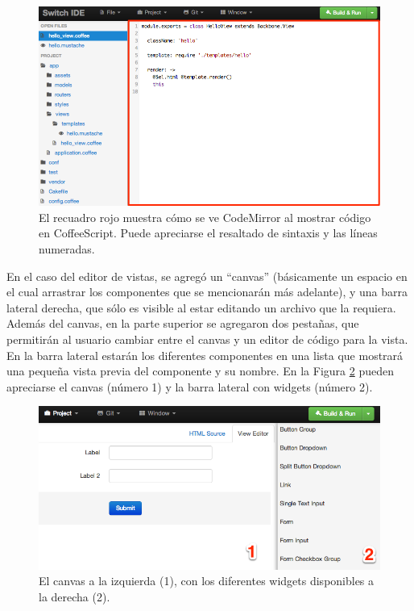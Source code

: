 \documentclass[12pt,spanish,letter]{report}
\makeatletter
\def\maxwidth{\ifdim\Gin@nat@width>\linewidth\linewidth
\else\Gin@nat@width\fi}
\let\Oldincludegraphics\includegraphics
\renewcommand{\includegraphics}[1]{\Oldincludegraphics[width=\maxwidth]{#1}}
\makeatother
\begin{document}
\begin{figure}[htbp]
\centering
\includegraphics{figures/codemirror.png}
\caption{El recuadro rojo muestra cómo se ve CodeMirror al mostrar
código en CoffeeScript. Puede apreciarse el resaltado de sintaxis y las
líneas numeradas. \label{figures:codemirror}}
\end{figure}

En el caso del editor de vistas, se agregó un ``canvas'' (básicamente un
espacio en el cual arrastrar los componentes que se mencionarán más
adelante), y una barra lateral derecha, que sólo es visible al estar
editando un archivo que la requiera. Además del canvas, en la parte
superior se agregaron dos pestañas, que permitirán al usuario cambiar
entre el canvas y un editor de código para la vista. En la barra lateral
estarán los diferentes componentes en una lista que mostrará una pequeña
vista previa del componente y su nombre. En la Figura
\ref{figures:canvas} pueden apreciarse el canvas (número 1) y la barra
lateral con widgets (número 2).

\begin{figure}[htbp]
\centering
\includegraphics{figures/canvas.png}
\caption{El canvas a la izquierda (1), con los diferentes widgets
disponibles a la derecha (2). \label{figures:canvas}}
\end{figure}
\end{document}
